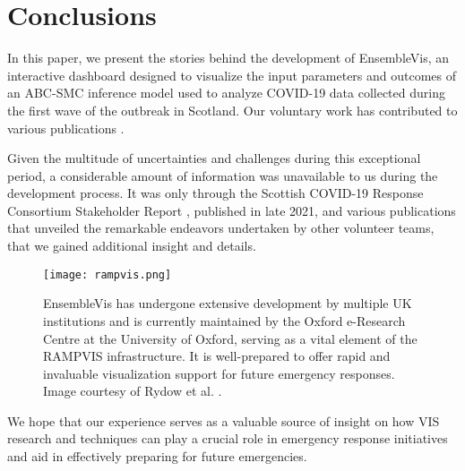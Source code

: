 \section{Conclusions}

In this paper, we present the stories behind the development of EnsembleVis, an interactive dashboard designed to visualize the input parameters and outcomes of an ABC-SMC inference model used to analyze COVID-19 data collected during the first wave of the outbreak in Scotland. Our voluntary work has contributed to various publications \cite{chen2022RAMPVIS,dykes2022Visualizationb,khan2022Propagating,khan2022Rapid,rydow2023RAMPVIS}.

Given the multitude of uncertainties and challenges during this exceptional period, a considerable amount of information was unavailable to us during the development process. It was only through the Scottish COVID-19 Response Consortium Stakeholder Report \cite{abdalla2021Scottish}, published in late 2021, and various publications that unveiled the remarkable endeavors undertaken by other volunteer teams, that we gained additional insight and details.

\begin{figure}[tb!]
    \centering
    \texttt{[image: rampvis.png]}
    \caption{EnsembleVis has undergone extensive development by multiple UK institutions and is currently maintained by the Oxford e-Research Centre at the University of Oxford, serving as a vital element of the RAMPVIS infrastructure. It is well-prepared to offer rapid and invaluable visualization support for future emergency responses. Image courtesy of Rydow et al. \cite{rydow2023RAMPVIS}.
    }
    \label{fig:rampvis}

\end{figure}

We hope that our experience serves as a valuable source of insight on how VIS research and techniques can play a crucial role in emergency response initiatives and aid in effectively preparing for future emergencies.